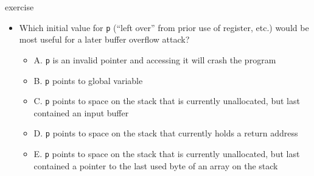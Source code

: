 \begin{frame}[fragile,label=infoDiscEx]{exercise}
\vspace{-.25cm}
\begin{itemize}
\item Which initial value for \texttt{p} (``left over'' from prior use of register, etc.) would be 
    most useful for a later buffer overflow attack?
\begin{itemize}
\item A. \texttt{p} is an invalid pointer and accessing it will crash the program
\item B. \texttt{p} points to global variable
\item C. \texttt{p} points to space on the stack that is currently unallocated, but last contained an input buffer
\item D. \texttt{p} points to space on the stack that currently holds a return address
\item E. \texttt{p} points to space on the stack that is currently unallocated, but last contained a pointer to the last used byte of an array on the stack
\end{itemize}
\end{itemize}
\end{frame}
